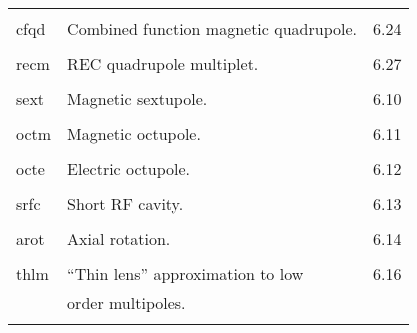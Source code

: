 \begin{center}
\begin{tabular}{lll}
\vspace{-3mm}& &\\
\hspace{1.5em}cfqd    &       Combined function magnetic quadrupole. &  \hspace{2em}6.24\\
\vspace{-3mm}& &\\
\hspace{1.5em}recm    &         REC quadrupole multiplet.              & \hspace{2em}6.27\\
\vspace{-3mm}& &\\
\hspace{1.5em}sext    &         Magnetic sextupole.                  &  \hspace{2em}6.10\\
\vspace{-3mm}& &\\
\hspace{1.5em}octm    &         Magnetic octupole.                   &  \hspace{2em}6.11\\
\vspace{-3mm}& &\\
\hspace{1.5em}octe    &         Electric octupole.                   &  \hspace{2em}6.12\\
\vspace{-3mm}& &\\
\hspace{1.5em}srfc    &         Short RF cavity.                     &  \hspace{2em}6.13\\
\vspace{-3mm}& &\\
\hspace{1.5em}arot    &         Axial rotation.                      &  \hspace{2em}6.14\\
\vspace{-3mm}& &\\
\hspace{1.5em}thlm    &         ``Thin lens'' approximation to low    &\hspace{2em}6.16\\
               &         order multipoles.                    &      \\
\vspace{-3mm}& &\\
\end{tabular}


\end{center}
